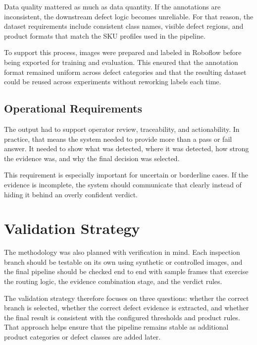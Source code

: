 \documentclass[12pt,a4paper]{report}
\begin{document}
Data quality mattered as much as data quantity. If the annotations are inconsistent, the downstream defect logic becomes unreliable. For that reason, the dataset requirements include consistent class names, visible defect regions, and product formats that match the SKU profiles used in the pipeline.

To support this process, images were prepared and labeled in Roboflow before being exported for training and evaluation. This ensured that the annotation format remained uniform across defect categories and that the resulting dataset could be reused across experiments without reworking labels each time.

\subsection{Operational Requirements}
\label{subsec:operational-requirements}

The output had to support operator review, traceability, and actionability. In practice, that means the system needed to provide more than a pass or fail answer. It needed to show what was detected, where it was detected, how strong the evidence was, and why the final decision was selected.

This requirement is especially important for uncertain or borderline cases. If the evidence is incomplete, the system should communicate that clearly instead of hiding it behind an overly confident verdict.

\section{Validation Strategy}
\label{sec:validation-strategy}

The methodology was also planned with verification in mind. Each inspection branch should be testable on its own using synthetic or controlled images, and the final pipeline should be checked end to end with sample frames that exercise the routing logic, the evidence combination stage, and the verdict rules.

The validation strategy therefore focuses on three questions: whether the correct branch is selected, whether the correct defect evidence is extracted, and whether the final result is consistent with the configured thresholds and product rules. That approach helps ensure that the pipeline remains stable as additional product categories or defect classes are added later.

\end{document}
